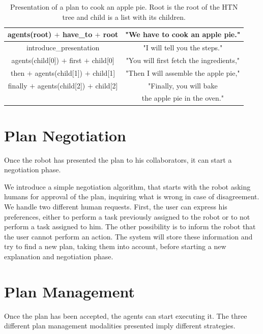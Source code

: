 \begin{table}
\centering
\scriptsize
\renewcommand{\arraystretch}{1.3}
\begin{tabular}{c|c}
   agents(root) $+$ have\_to $+$ root  & "We have to cook an apple pie." \\
   \hline
   introduce\_presentation & "I will tell you the steps." \\
   \hline
   agents(child[0]) $+$ first $+$ child[0] & "You will first fetch the ingredients," \\
   \hline
   then $+$ agents(child[1]) $+$  child[1] & "Then I will assemble the apple pie," \\
   \hline
   finally $+$ agents(child[2]) $+$  child[2] & "Finally, you will bake \\
   & the apple pie in the oven." \\
\end{tabular}
\caption[Presentation of a plan to cook an apple pie]{Presentation of a plan to cook an apple pie. Root is the root of the HTN tree and child is a list with its children.}
 \label{table:plan_management-pie-present}    
\end{table}

\section{Plan Negotiation}
\label{sec:plan_management-negotiation}
Once the robot has presented the plan to his collaborators, it can start a negotiation phase. 

We introduce a simple negotiation algorithm, that starts with the robot asking humans for approval of the plan, inquiring what is wrong in case of disagreement. We handle two different human requests. First, the user can express his preferences, either to perform a task previously assigned to the robot or to not perform a task assigned to him. The other possibility is to inform the robot that the user cannot perform an action. The system will store these information and try to find a new plan, taking them into account, before starting a new explanation and negotiation phase.
 

\section{Plan Management}
\label{sec:plan_management-plan_manager}

Once the plan has been accepted, the agents can start executing it. The three different plan management modalities presented imply different strategies.


